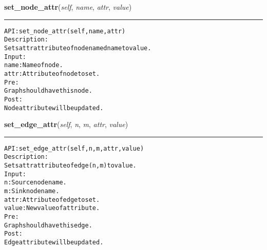     \vspace{0.5ex}

\hspace{.8\funcindent}\begin{boxedminipage}{\funcwidth}

    \raggedright \textbf{set\_node\_attr}(\textit{self}, \textit{name}, \textit{attr}, \textit{value})

    \vspace{-1.5ex}

    \rule{\textwidth}{0.5\fboxrule}
\setlength{\parskip}{2ex}
\begin{alltt}

API: set\_node\_attr(self, name, attr)
Description:
Sets attr attribute of node named name to value.
Input:
    name: Name of node.
    attr: Attribute of node to set.
Pre:
    Graph should have this node.
Post:
    Node attribute will be updated.
\end{alltt}

\setlength{\parskip}{1ex}
    \end{boxedminipage}

    \label{coinor:gimpy:graph:Graph:set_edge_attr}

    \vspace{0.5ex}

\hspace{.8\funcindent}\begin{boxedminipage}{\funcwidth}

    \raggedright \textbf{set\_edge\_attr}(\textit{self}, \textit{n}, \textit{m}, \textit{attr}, \textit{value})

    \vspace{-1.5ex}

    \rule{\textwidth}{0.5\fboxrule}
\setlength{\parskip}{2ex}
\begin{alltt}

API: set\_edge\_attr(self, n, m, attr, value)
Description:
Sets attr attribute of edge (n,m) to value.
Input:
    n: Source node name.
    m: Sink node name.
    attr: Attribute of edge to set.
    value: New value of attribute.
Pre:
    Graph should have this edge.
Post:
    Edge attribute will be updated.
\end{alltt}

\setlength{\parskip}{1ex}
    \end{boxedminipage}

